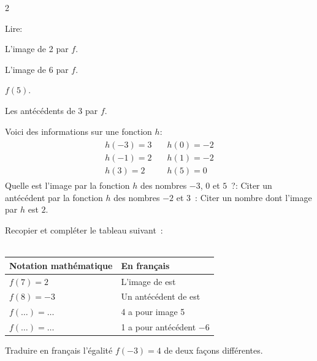 \begin{multicols}{2}
\begin{exercice}{}{}
    Lire:
    \begin{enumeratebf}
        \item L'image de 2 par $f$.
        \item L'image de 6 par $f$.
        \item $f(5)$.
        \item Les antécédents de 3 par $f$.
    \end{enumeratebf}
\end{exercice}

\begin{exercice}{}{}
    Voici des informations sur une fonction $h$:
    \begin{align*}
        \begin{array}{ll}
        h(-3) = 3 &\quad h(0) = -2 \\
        h(-1) = 2 &\quad h(1) = -2 \\
        h(3) = 2 &\quad h(5) = 0
        \end{array}
    \end{align*}
    Quelle est l'image par la fonction $h$ des nombres $-3$, $0$ et $5$~?:
    Citer un antécédent par la fonction $h$ des nombres $-2$ et $3$~:
    Citer un nombre dont l'image par $h$ est $2$.
\end{exercice}


\end{multicols}

\begin{exercice}{}{}

\begin{enumeratebf}
    \item Recopier et compléter le tableau suivant~:\\\\
        \begin{tabular}{|l|l|}
        \hline
        Notation mathématique & En français \\
        \hline
        $f(7)=2$ & L'image de \dotuline{\hspace{1cm}} est \dotuline{\hspace{1cm}} \\
        $f(8)=-3$ & Un antécédent de \dotuline{\hspace{1cm}} est \dotuline{\hspace{1cm}} \\
        $f(\ldots)=\ldots$ & 4 a pour image 5 \\
        $f(\ldots)=\ldots$ & 1 a pour antécédent $-6$ \\
        \hline
        \end{tabular}
    \item Traduire en français l'égalité $f(-3)=4$ de deux façons différentes.
\end{enumeratebf}
    

\end{exercice}

